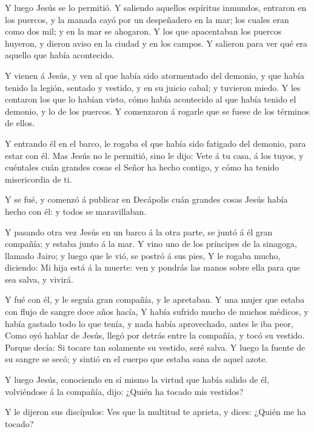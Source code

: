  Y luego Jesús se lo permitió. Y saliendo aquellos
espíritus inmundos, entraron en los puercos, y la manada cayó por un
despeñadero en la mar; los cuales eran como dos mil; y en la mar se
ahogaron.  Y los que apacentaban los puercos huyeron, y
dieron aviso en la ciudad y en los campos. Y salieron para ver qué era
aquello que había acontecido.

 Y vienen á Jesús, y ven al que había sido atormentado del
demonio, y que había tenido la legión, sentado y vestido, y en su juicio
cabal; y tuvieron miedo.  Y les contaron los que lo habían
visto, cómo había acontecido al que había tenido el demonio, y lo de los
puercos.  Y comenzaron á rogarle que se fuese de los
términos de ellos.

 Y entrando él en el barco, le rogaba el que había sido
fatigado del demonio, para estar con él.  Mas Jesús no le
permitió, sino le dijo: Vete á tu casa, á los tuyos, y cuéntales cuán
grandes cosas el Señor ha hecho contigo, y cómo ha tenido misericordia
de ti.

 Y se fué, y comenzó á publicar en Decápolis cuán grandes
cosas Jesús había hecho con él: y todos se maravillaban.

 Y pasando otra vez Jesús en un barco á la otra parte, se
juntó á él gran compañía; y estaba junto á la mar.  Y vino
uno de los príncipes de la sinagoga, llamado Jairo; y luego que le vió,
se postró á sus pies,  Y le rogaba mucho, diciendo: Mi hija
está á la muerte: ven y pondrás las manos sobre ella para que sea salva,
y vivirá.

 Y fué con él, y le seguía gran compañía, y le apretaban.
 Y una mujer que estaba con flujo de sangre doce años
hacía,  Y había sufrido mucho de muchos médicos, y había
gastado todo lo que tenía, y nada había aprovechado, antes le iba peor,
 Como oyó hablar de Jesús, llegó por detrás entre la
compañía, y tocó su vestido.  Porque decía: Si tocare tan
solamente su vestido, seré salva.  Y luego la fuente de su
sangre se secó; y sintió en el cuerpo que estaba sana de aquel azote.

 Y luego Jesús, conociendo en sí mismo la virtud que había
salido de él, volviéndose á la compañía, dijo: ¿Quién ha tocado mis
vestidos?

 Y le dijeron sus discípulos: Ves que la multitud te
aprieta, y dices: ¿Quién me ha tocado?

